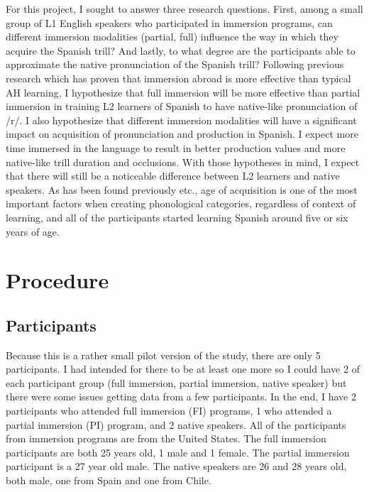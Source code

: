 \documentclass[
  a4paper,
  11pt,
  twocolumn]{article}
\begin{document}
For this project, I sought to answer three research questions. First,
among a small group of L1 English speakers who participated in immersion
programs, can different immersion modalities (partial, full) influence
the way in which they acquire the Spanish trill? And lastly, to what
degree are the participants able to approximate the native pronunciation
of the Spanish trill? Following previous research which has proven that
immersion abroad is more effective than typical AH learning, I
hypothesize that full immersion will be more effective than partial
immersion in training L2 learners of Spanish to have native-like
pronunciation of /r/. I also hypothesize that different immersion
modalities will have a significant impact on acquisition of
pronunciation and production in Spanish. I expect more time immersed in
the language to result in better production values and more native-like
trill duration and occlusions. With those hypotheses in mind, I expect
that there will still be a noticeable difference between L2 learners and
native speakers. As has been found previously \cite{flege_factors_1988}
etc., age of acquisition is one of the most important factors when
creating phonological categories, regardless of context of learning, and
all of the participants started learning Spanish around five or six
years of age.

\section{Procedure}

\subsection{Participants}

Because this is a rather small pilot version of the study, there are
only 5 participants. I had intended for there to be at least one more so
I could have 2 of each participant group (full immersion, partial
immersion, native speaker) but there were some issues getting data from
a few participants. In the end, I have 2 participants who attended full
immersion (FI) programs, 1 who attended a partial immersion (PI)
program, and 2 native speakers. All of the participants from immersion
programs are from the United States. The full immersion participants are
both 25 years old, 1 male and 1 female. The partial immersion
participant is a 27 year old male. The native speakers are 26 and 28
years old, both male, one from Spain and one from Chile.
\end{document}
